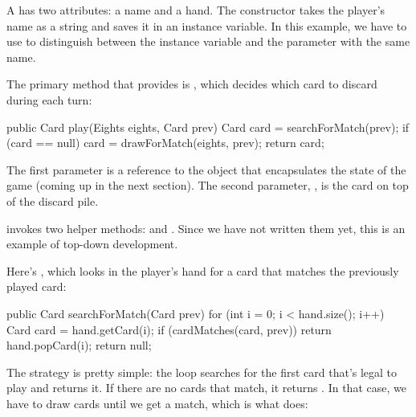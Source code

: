 
\begin{code}
public class Player {

    private String name;
    private Hand hand;

    public Player(String name) {
        this.name = name;
        this.hand = new Hand(name);
    }
\end{code}

A  has two  attributes: a name and a hand.
The constructor takes the player's name as a string and saves it in an instance variable.
In this example, we have to use  to distinguish between the instance variable and the parameter with the same name.

The primary method that  provides is , which decides which card to discard during each turn:

\begin{code}
public Card play(Eights eights, Card prev) {
    Card card = searchForMatch(prev);
    if (card == null) {
        card = drawForMatch(eights, prev);
    }
    return card;
}
\end{code}

The first parameter is a reference to the  object that encapsulates the state of the game (coming up in the next section).
The second parameter, , is the card on top of the discard pile.

 invokes two helper methods:  and .
Since we have not written them yet, this is an example of top-down development.


Here's , which looks in the player's hand for a card that matches the previously played card:

\begin{code}
public Card searchForMatch(Card prev) {
    for (int i = 0; i < hand.size(); i++) {
        Card card = hand.getCard(i);
        if (cardMatches(card, prev)) {
            return hand.popCard(i);
        }
    }
    return null;
}
\end{code}

The strategy is pretty simple: the  loop searches for the first card that's legal to play and returns it.
If there are no cards that match, it returns .
In that case, we have to draw cards until we get a match, which is what  does:

